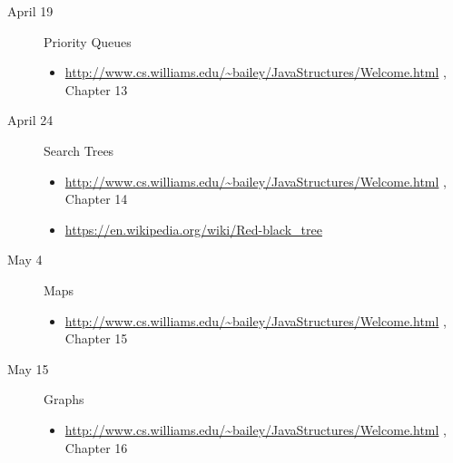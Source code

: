 \documentclass{article}
\newcommand{\bailey}{
  \url{http://www.cs.williams.edu/~bailey/JavaStructures/Welcome.html}
  }
\begin{document}
\begin{description}
\item[April 19] Priority Queues
  \begin{itemize}
  \item \bailey, Chapter 13
  \end{itemize}

\item[April 24] Search Trees
  \begin{itemize}
  \item \bailey, Chapter 14
\item \url{https://en.wikipedia.org/wiki/Red-black_tree}

  \end{itemize}

\item[May 4] Maps
  \begin{itemize}
  \item \bailey, Chapter 15
  \end{itemize}

\item[May 15] Graphs
  \begin{itemize}
  \item \bailey, Chapter 16
  \end{itemize}
  

\end{description}
\end{document}
